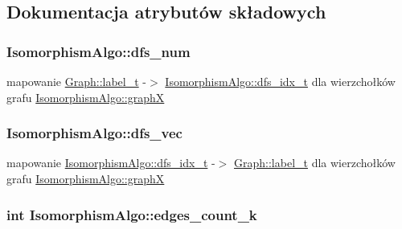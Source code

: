 \subsection{Dokumentacja atrybutów składowych}
\hypertarget{classIsomorphismAlgo_a4de551ab18fc95ef86ea8c79260656b2}{
\subsubsection[{dfs\-\_\-num}]{ Isomorphism\-Algo\-::dfs\-\_\-num\hspace{0.3cm}{\ttfamily [private]}}}\label{classIsomorphismAlgo_a4de551ab18fc95ef86ea8c79260656b2}


mapowanie \hyperlink{classGraph_a2237a0ada8484c37b8200c0e3685ca71}{Graph\-::label\-\_\-t} -\/$>$ \hyperlink{classIsomorphismAlgo_ab4ec6489271a99fae3bd2476b22ef35b}{Isomorphism\-Algo\-::dfs\-\_\-idx\-\_\-t} dla wierzchołków grafu \hyperlink{classIsomorphismAlgo_a78bc7264b0a6a264b0343209b3ca3647}{Isomorphism\-Algo\-::graph\-X} 

\hypertarget{classIsomorphismAlgo_affd06f1251c222a483b7188313a11193}{
\subsubsection[{dfs\-\_\-vec}]{ Isomorphism\-Algo\-::dfs\-\_\-vec\hspace{0.3cm}{\ttfamily [private]}}}\label{classIsomorphismAlgo_affd06f1251c222a483b7188313a11193}


mapowanie \hyperlink{classIsomorphismAlgo_ab4ec6489271a99fae3bd2476b22ef35b}{Isomorphism\-Algo\-::dfs\-\_\-idx\-\_\-t} -\/$>$ \hyperlink{classGraph_a2237a0ada8484c37b8200c0e3685ca71}{Graph\-::label\-\_\-t} dla wierzchołków grafu \hyperlink{classIsomorphismAlgo_a78bc7264b0a6a264b0343209b3ca3647}{Isomorphism\-Algo\-::graph\-X} 

\hypertarget{classIsomorphismAlgo_af185ab17b845defe14c0998c173e70ae}{
\subsubsection[{edges\-\_\-count\-\_\-k}]{\setlength{\rightskip}{0pt plus 5cm}int Isomorphism\-Algo\-::edges\-\_\-count\-\_\-k\hspace{0.3cm}{\ttfamily [private]}}}\label{classIsomorphismAlgo_af185ab17b845defe14c0998c173e70ae}


